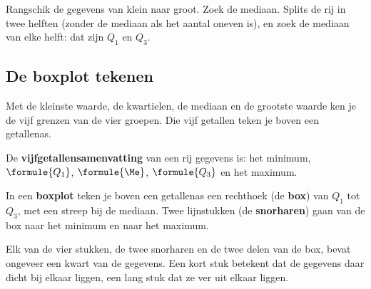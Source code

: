 \begin{werkwijze}
Rangschik de gegevens van klein naar groot. Zoek de mediaan. Splits de rij in twee helften (zonder de mediaan als het aantal oneven is), en zoek de mediaan van elke helft: dat zijn $Q_1$ en $Q_3$.
\end{werkwijze}

\begin{oefeningen}
\end{oefeningen}

\subsection{De boxplot tekenen}

Met de kleinste waarde, de kwartielen, de mediaan en de grootste waarde ken je de vijf grenzen van de vier groepen. Die vijf getallen teken je boven een getallenas.

\begin{theorie}
De \textbf{\textcolor{accent}{vijfgetallensamenvatting}} van een rij gegevens is: het minimum, $\formule{Q_1}$, $\formule{\Me}$, $\formule{Q_3}$ en het maximum.

\vspace{1mm}
In een \textbf{\textcolor{accent}{boxplot}} teken je boven een getallenas een rechthoek (de \textbf{\textcolor{accent}{box}}) van $Q_1$ tot $Q_3$, met een streep bij de mediaan. Twee lijnstukken (de \textbf{\textcolor{accent}{snorharen}}) gaan van de box naar het minimum en naar het maximum.

\end{theorie}

Elk van de vier stukken, de twee snorharen en de twee delen van de box, bevat ongeveer een kwart van de gegevens. Een kort stuk betekent dat de gegevens daar dicht bij elkaar liggen, een lang stuk dat ze ver uit elkaar liggen.

